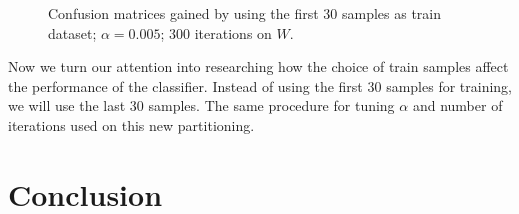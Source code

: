 \documentclass{article}
\begin{document}
\begin{figure}
    \centering
    \qquad
    \caption{Confusion matrices gained by using the first 30 samples as train dataset;%
    $\alpha = 0.005$; 300 iterations on $W$.}\label{fig:CM_30_first}
\end{figure}

Now we turn our attention into researching how the choice of train samples affect the performance of
the classifier. Instead of using the first 30 samples for training, we will use the last 30 samples.
The same procedure for tuning $\alpha$ and number of iterations used on this new partitioning.


\section{Conclusion}
\end{document}
